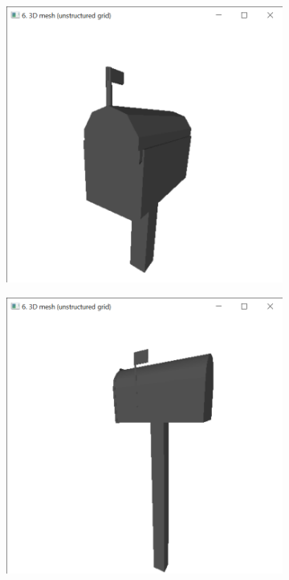 \documentclass{bigdata}
\begin{document}
\begin{figure}[h!]
  \centering
  \begin{subfigure}[b]{0.2\linewidth}
    \includegraphics[width=\linewidth]{Pictures/Evaluation/mailboxClass/stair1.png}
  \end{subfigure}
  \begin{subfigure}[b]{0.2\linewidth}
    \includegraphics[width=\linewidth]{Pictures/Evaluation/mailBoxClass/stair2.png}

\end{subfigure}
\end{figure}
\end{document}
